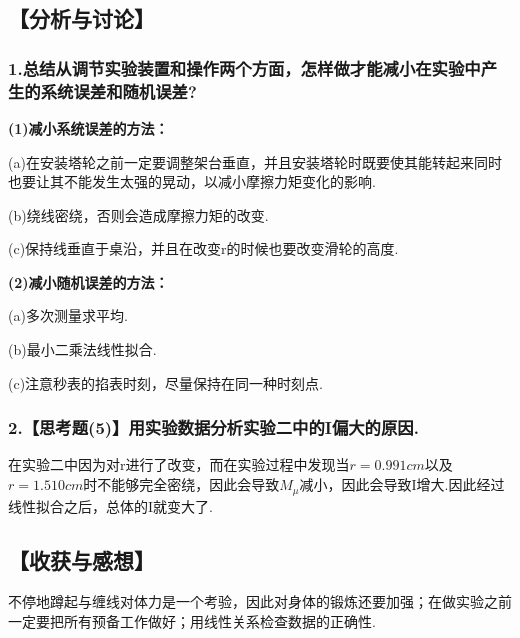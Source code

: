 \documentclass[12pt,a4paper,UTF8]{ctexart}
\begin{document}
\subsection*{【分析与讨论】}
\subsubsection*{1.总结从调节实验装置和操作两个方面，怎样做才能减小在实验中产生的系统误差和随机误差?}
\textbf{(1)减小系统误差的方法：}\par
(a)在安装塔轮之前一定要调整架台垂直，并且安装塔轮时既要使其能转起来同时也要让其不能发生太强的晃动，以减小摩擦力矩变化的影响.\par
(b)绕线密绕，否则会造成摩擦力矩的改变.\par
(c)保持线垂直于桌沿，并且在改变r的时候也要改变滑轮的高度.\par
\textbf{(2)减小随机误差的方法：}\par
(a)多次测量求平均.\par
(b)最小二乘法线性拟合.\par
(c)注意秒表的掐表时刻，尽量保持在同一种时刻点.
\subsubsection*{2.【思考题(5)】用实验数据分析实验二中的I偏大的原因.}
在实验二中因为对r进行了改变，而在实验过程中发现当$r=0.991cm$以及$r=1.510cm$时不能够完全密绕，因此会导致$M_{\mu}$减小，因此会导致I增大.因此经过线性拟合之后，总体的I就变大了.
\subsection*{【收获与感想】}
不停地蹲起与缠线对体力是一个考验，因此对身体的锻炼还要加强；在做实验之前一定要把所有预备工作做好；用线性关系检查数据的正确性.
\end{document}
